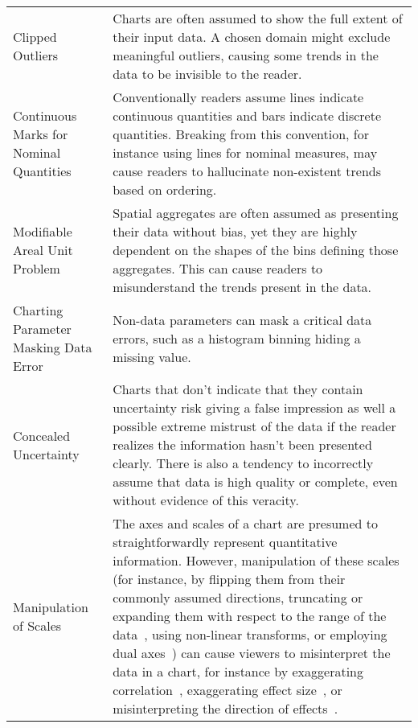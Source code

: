 \begin{longtable}{p{3cm}p{14cm}}
 \rowcolor{colorc-opaque}Clipped Outliers  & Charts are often assumed to show the full extent of their input data. A chosen domain might exclude meaningful outliers, causing some trends in the data to be invisible to the reader. \\
 \rowcolor{colorc}Continuous Marks for Nominal Quantities  & Conventionally readers assume lines indicate continuous quantities and bars indicate discrete quantities. Breaking from this convention, for instance using lines for nominal measures, may cause readers to hallucinate non-existent trends based on ordering.  \cite{mcnuttlinting, zacks1999bars}\\
 \rowcolor{colorc-opaque}Modifiable Areal Unit Problem  & Spatial aggregates are often assumed as presenting their data without bias, yet they are highly dependent on the shapes of the bins defining those aggregates. This can cause readers to misunderstand the trends present in the data. \cite{fotheringham1991modifiable, kindlmann2014algebraic}\\
 \rowcolor{colorc}Charting Parameter Masking Data Error & Non-data parameters can mask a critical data errors, such as a histogram binning hiding a missing value. \cite{correll2018looks}\\
 \rowcolor{colorc-opaque}Concealed \newline Uncertainty  & Charts that don't indicate that they contain uncertainty risk giving a false impression as well a possible extreme mistrust of the data if the reader realizes the information hasn't been presented clearly. There is also a tendency to incorrectly assume that data is high quality or complete, even without evidence of this veracity. \cite{song2018s, few2019loom, mayrTrust2019, sacha2015role}\\
 \rowcolor{colorc}Manipulation of Scales & The axes and scales of a chart are presumed to straightforwardly represent quantitative information. However, manipulation of these scales (for instance, by flipping them from their commonly assumed directions, truncating or expanding them with respect to the range of the data~\cite{pandey2015deceptive, correll2017black, cleveland1982variables, ritchie2019lie, correll2019truncating}, using non-linear transforms, or employing dual axes~\cite{KindlmannAlgebraicVisPedagogyPDV2016, cairo2015graphics}) can cause viewers to misinterpret the data in a chart, for instance by exaggerating correlation~\cite{cleveland1982variables}, exaggerating effect size~\cite{correll2019truncating,pandey2015deceptive}, or misinterpreting the direction of effects~\cite{pandey2015deceptive}. \cite{cairo2015graphics,correll2017black,correll2019truncating,cleveland1982variables,KindlmannAlgebraicVisPedagogyPDV2016,pandey2015deceptive,ritchie2019lie}\\

\end{longtable}
